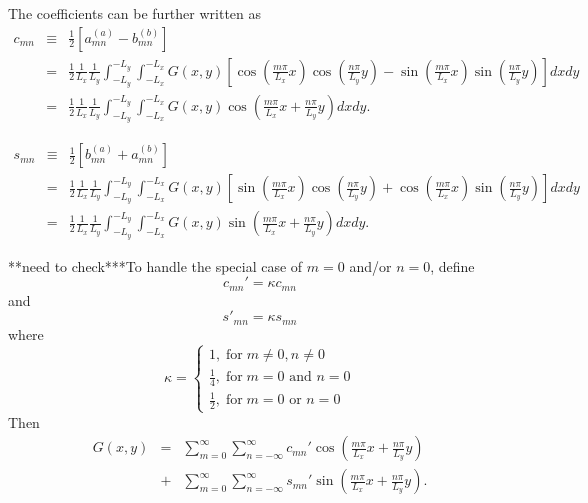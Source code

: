 \documentclass{article}
\newcommand{\infixand}{\text{ and }}
\newcommand{\infixor}{\text{ or }}
\newcommand{\tmop}[1]{\ensuremath{\operatorname{#1}}}
\begin{document}
The coefficients can be further written as
\begin{eqnarray}
  c_{m n} & \equiv & \frac{1}{2} [a_{m n}^{(a)} - b_{m n}^{(b)}] \nonumber\\
  & = & \frac{1}{2} \frac{1}{L_x}  \frac{1}{L_y} \int_{- L_y}^{- L_y} \int_{-
  L_x}^{- L_x} G (x, y) \left[ \cos \left( \frac{m \pi}{L_x} x \right) \cos
  \left( \frac{n \pi}{L_y} y \right) - \sin \left( \frac{m \pi}{L_x} x \right)
  \sin \left( \frac{n \pi}{L_y} y \right) \right] d x d y \nonumber\\
  & = & \frac{1}{2} \frac{1}{L_x}  \frac{1}{L_y} \int_{- L_y}^{- L_y} \int_{-
  L_x}^{- L_x} G (x, y) \cos \left( \frac{m \pi}{L_x} x + \frac{n \pi}{L_y} y
  \right) d x d y. 
\end{eqnarray}

\begin{eqnarray}
  s_{m n} & \equiv & \frac{1}{2} [b_{m n}^{(a)} + a_{m n}^{(b)}] \nonumber\\
  & = & \frac{1}{2} \frac{1}{L_x}  \frac{1}{L_y} \int_{- L_y}^{- L_y} \int_{-
  L_x}^{- L_x} G (x, y) \left[ \sin \left( \frac{m \pi}{L_x} x \right) \cos
  \left( \frac{n \pi}{L_y} y \right) + \cos \left( \frac{m \pi}{L_x} x \right)
  \sin \left( \frac{n \pi}{L_y} y \right) \right] d x d y \nonumber\\
  & = & \frac{1}{2} \frac{1}{L_x}  \frac{1}{L_y} \int_{- L_y}^{- L_y} \int_{-
  L_x}^{- L_x} G (x, y) \sin \left( \frac{m \pi}{L_x} x + \frac{n \pi}{L_y} y
  \right) d x d y. 
\end{eqnarray}


**need to check***To handle the special case of $m = 0$ and/or $n = 0$, define
\[ c_{m n}' = \kappa c_{m n} \]
and
\[ s'_{m n} = \kappa s_{m n} \]
where
\begin{equation}
  \kappa = \left\{\begin{array}{l}
    1, \tmop{for} m \neq 0, n \neq 0\\
    \frac{1}{4}, \tmop{for} m = 0 \infixand n = 0\\
    \frac{1}{2}, \tmop{for} m = 0 \infixor n = 0
  \end{array}\right.
\end{equation}
Then
\begin{eqnarray*}
  G (x, y) & = & \sum_{m = 0}^{\infty} \sum_{n = - \infty}^{\infty} c_{m n}'
  \cos \left( \frac{m \pi}{L_x} x + \frac{n \pi}{L_y} y \right)\\
  & + & \sum_{m = 0}^{\infty} \sum_{n = - \infty}^{\infty} s_{m n}' \sin
  \left( \frac{m \pi}{L_x} x + \frac{n \pi}{L_y} y \right) .
\end{eqnarray*}
\end{document}
